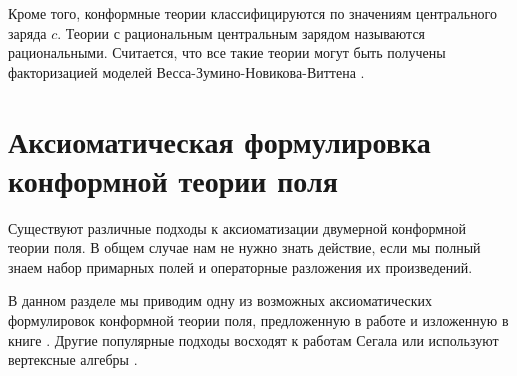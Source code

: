 Кроме того, конформные теории классифицируются по значениям центрального заряда $c$. Теории с рациональным
центральным зарядом называются рациональными. Считается, что все такие теории могут быть получены
факторизацией моделей Весса-Зумино-Новикова-Виттена \cite{moore1989taming}.

\section{Аксиоматическая формулировка конформной теории поля}
\label{sec:conformal-field-theory-general}


Существуют различные подходы к аксиоматизации двумерной конформной теории поля. В общем случае нам
не нужно знать действие, если мы полный знаем набор примарных полей и операторные разложения их
произведений. 

В данном разделе мы приводим одну из возможных аксиоматических формулировок конформной теории поля, предложенную в работе \cite{felder1989structure} и изложенную в книге \cite{schottenloher2008mathematical}. Другие популярные подходы восходят к работам Сегала \cite{segal1987definition} или используют вертексные алгебры \cite{kac1998vertex}. 

